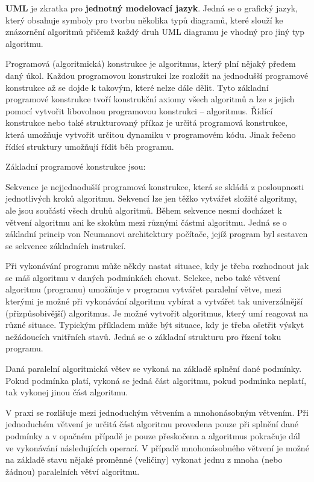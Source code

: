 {\bf UML} je zkratka pro {\bf jednotný modelovací jazyk}. Jedná se o grafický jazyk, který obsahuje symboly pro tvorbu několika typů diagramů, které slouží ke znázornění algoritmů přičemž každý druh UML diagramu je vhodný pro jiný typ algoritmu.


Programová (algoritmická) konstrukce je algoritmus, který plní nějaký předem daný úkol. Každou programovou konstrukci lze rozložit na jednodušší programové konstrukce až se dojde k takovým, které nelze dále dělit. Tyto základní programové konstrukce tvoří konstrukční axiomy všech algoritmů a lze s jejich pomocí vytvořit libovolnou programovou konstrukci – algoritmus. Řídící konstrukce nebo také strukturovaný příkaz je určitá programová konstrukce, která umožňuje vytvořit určitou dynamiku v programovém kódu. Jinak řečeno řídící struktury umožňují řídit běh programu. 

Základní programové konstrukce jsou:

\vskip 4mm
\vskip 4mm


Sekvence je nejjednodušší programová konstrukce, která se skládá z posloupnosti jednotlivých kroků algoritmu. Sekvencí lze jen těžko vytvářet složité algoritmy, ale jsou součástí všech druhů algoritmů. Během sekvence nesmí docházet k větvení algoritmu ani ke skokům mezi různými částmi algoritmu. Jedná se o základní princip von Neumanovi architektury počítače, jejíž program byl sestaven se sekvence základních instrukcí.

Při vykonávání programu může někdy nastat situace, kdy je třeba rozhodnout jak se máš algoritmu v daných podmínkách chovat. Selekce, nebo také větvení algoritmu (programu) umožňuje v programu vytvářet paralelní větve, mezi kterými je možné při vykonávání algoritmu vybírat a vytvářet tak univerzálnější (přizpůsobivější) algoritmus. Je možné vytvořit algoritmus, který umí reagovat na různé situace. Typickým příkladem může být situace, kdy je třeba ošetřit výskyt nežádoucích vnitřních stavů. Jedná se o základní strukturu pro řízení toku programu.

Daná paralelní algoritmická větev se vykoná na základě splnění dané podmínky. Pokud podmínka platí, vykoná se jedná část algoritmu, pokud podmínka neplatí, tak vykonej jinou část algoritmu.

V praxi se rozlišuje mezi jednoduchým větvením a mnohonásobným větvením. Při jednoduchém větvení je určitá část algoritmu provedena pouze při splnění dané podmínky a v opačném případě je pouze přeskočena a algoritmus pokračuje dál ve vykonávání následujících operací. V případě mnohonásobného větvení je možné na základě stavu nějaké proměnné (veličiny) vykonat jednu z mnoha (nebo žádnou) paralelních větví algoritmu. 

